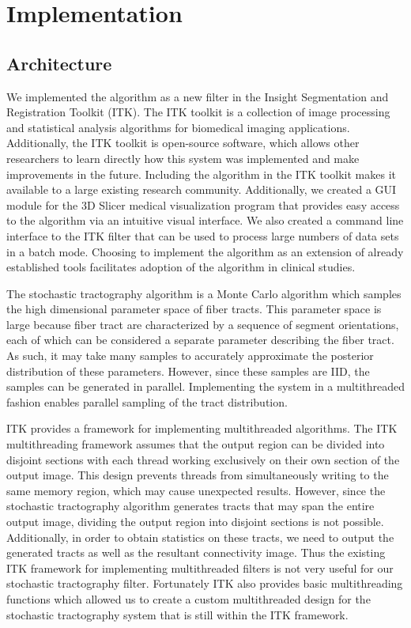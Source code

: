 \chapter{Implementation}
\section{Architecture}
We implemented the algorithm as a new filter in the Insight Segmentation and Registration Toolkit (ITK).  The ITK toolkit is a collection of image processing and statistical analysis algorithms for biomedical imaging applications.  Additionally, the ITK toolkit is open-source software, which allows other researchers to learn directly how this system was implemented and make improvements in the future.  Including the algorithm in the ITK toolkit makes it available to a large existing research community.  Additionally, we created a GUI module for the 3D Slicer medical visualization program that provides easy access to the algorithm via an intuitive visual interface.  We also created a command line interface to the ITK filter that can be used to process large numbers of data sets in a batch mode.  Choosing to implement the algorithm as an extension of already established tools facilitates adoption of the algorithm in clinical studies.

The stochastic tractography algorithm is a Monte Carlo algorithm which samples the high dimensional parameter space of fiber tracts.  This parameter space is large because fiber tract are characterized by a sequence of segment orientations, each of which can be considered a separate parameter describing the fiber tract.  As such, it may take many samples to accurately approximate the posterior distribution of these parameters.  However, since these samples are IID, the samples can be generated in parallel.  Implementing the system in a multithreaded fashion enables parallel sampling of the tract distribution.

ITK  provides a framework for implementing multithreaded algorithms.  The ITK multithreading framework assumes that the output region can be divided into disjoint sections with each thread working exclusively on their own section of the output image.  This design prevents threads from simultaneously writing to the same memory region, which may cause unexpected results.  However, since the stochastic tractography algorithm generates tracts that may span the entire output image, dividing the output region into disjoint sections is not possible.  Additionally, in order to obtain statistics on these tracts, we need to output the generated tracts as well as the resultant connectivity image.  Thus the existing ITK framework for implementing multithreaded filters is not very useful for our stochastic tractography filter.  Fortunately ITK also provides basic multithreading functions which allowed us to create a custom multithreaded design for the stochastic tractography system that is still within the ITK framework. 

